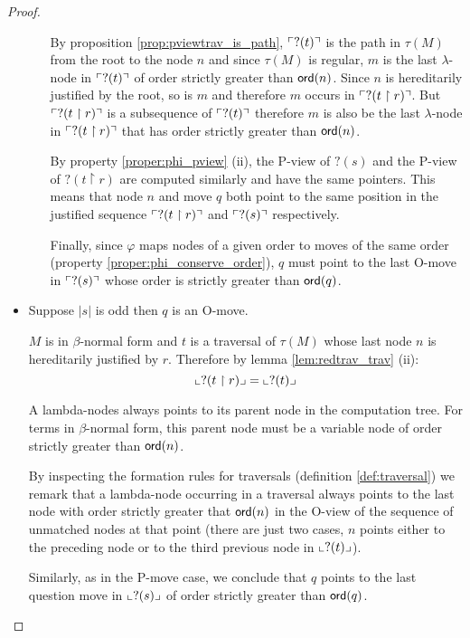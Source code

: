 \begin{proof}
\begin{itemize}
\begin{itemize}
By proposition \ref{prop:pviewtrav_is_path}, $\ulcorner ?(t) \urcorner$ is
the path in $\tau(M)$ from the root to the node $n$ and since
$\tau(M)$ is regular, $m$ is the last $\lambda$-node in $\ulcorner ?(t) \urcorner$ of order strictly greater than ${\sf ord}(n)$.
Since $n$ is hereditarily justified by the root, so is $m$ and therefore $m$ occurs in $\ulcorner ?(t \upharpoonright r) \urcorner$.
But $\ulcorner ?(t \upharpoonright r) \urcorner$ is a subsequence of $\ulcorner ?(t) \urcorner$ therefore $m$ is also be the last $\lambda$-node
in $\ulcorner ?(t \upharpoonright  r) \urcorner$ that has order strictly greater than ${\sf ord}(n)$.

By property \ref{proper:phi_pview} (ii), the P-view of $?(s)$ and the P-view of $?(t \upharpoonright r)$ are computed
similarly and have the same pointers. This means that
node $n$ and  move $q$ both point to the same position in
the justified sequence $\ulcorner ?(t\upharpoonright r) \urcorner$ and $\ulcorner ?(s) \urcorner$ respectively.

Finally, since $\varphi$ maps nodes of a given order to moves of the same order (property \ref{proper:phi_conserve_order}),
$q$ must point to the last O-move in $\ulcorner ?(s) \urcorner$ whose
order is strictly greater than ${\sf ord}(q)$.
\end{itemize}

\item Suppose $|s|$ is odd then $q$ is an O-move.

$M$ is in $\beta$-normal form and $t$ is a traversal of $\tau(M)$
whose last node $n$ is hereditarily justified by $r$. Therefore by lemma \ref{lem:redtrav_trav} (ii):
\begin{equation}
 \llcorner ?(t \upharpoonright r) \lrcorner = \llcorner ?(t) \lrcorner \label{eq:oview_r}
\end{equation}


A lambda-nodes always points to its parent node in the computation
tree. For terms in $\beta$-normal form, this parent node must be a
variable node of order strictly greater than ${\sf ord}(n)$.

By inspecting the formation rules for traversals (definition
\ref{def:traversal}) we remark that a lambda-node occurring in a
traversal always points to the last node with order strictly greater
that ${\sf ord}(n)$ in the O-view of the sequence of unmatched nodes at
that point (there are just two cases, $n$ points either to the
preceding node or to the third previous node in $\llcorner ?(t) \lrcorner$).

Similarly, as in the P-move case, we conclude that $q$ points to the
last question move in $\llcorner ?(s) \lrcorner$ of order strictly greater than
${\sf ord}(q)$.
\end{itemize}


\end{proof}
